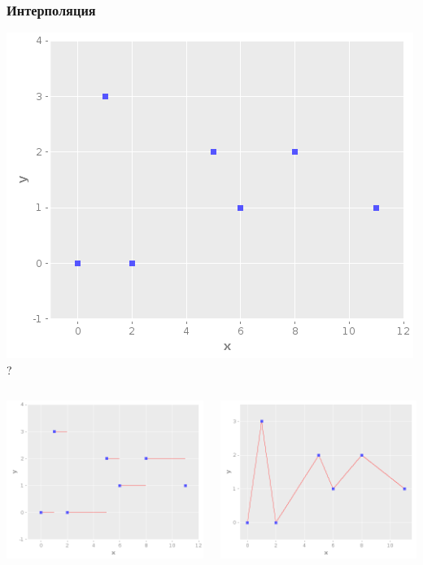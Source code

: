 \documentclass[russian]{beamer}
\begin{document}
\begin{frame}
  \frametitle{Интерполяция}
  \begin{center}
    \includegraphics[width=.4\textwidth,height=.4\textheight,keepaspectratio]{points}
    \\
    ?
  \end{center}
  \begin{columns}[c]
    \begin{column}{.35\textwidth}
      \includegraphics[width=\textwidth,height=\textheight,keepaspectratio]{interrupted}
    \end{column}
    \begin{column}{.35\textwidth}
      \includegraphics[width=\textwidth,height=\textheight,keepaspectratio]{linear_interpolation_1_var_small}

\end{column}
\end{columns}
\end{frame}
\end{document}
